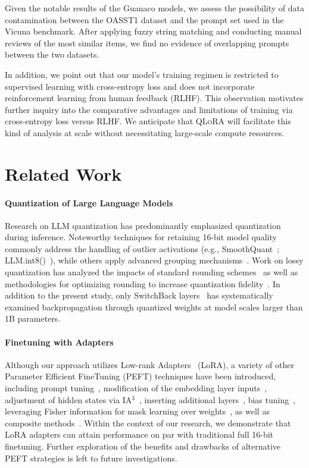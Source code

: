 Given the notable results of the {Guanaco} models, we assess the possibility of data contamination between the OASST1 dataset and the prompt set used in the Vicuna benchmark. After applying fuzzy string matching and conducting manual reviews of the most similar items, we find no evidence of overlapping prompts between the two datasets.

In addition, we point out that our model's training regimen is restricted to supervised learning with cross-entropy loss and does not incorporate reinforcement learning from human feedback (RLHF). This observation motivates further inquiry into the comparative advantages and limitations of training via cross-entropy loss versus RLHF. We anticipate that \textsc{QLoRA} will facilitate this kind of analysis at scale without necessitating large-scale compute resources.

\section{Related Work}

\paragraph{Quantization of Large Language Models} Research on LLM quantization has predominantly emphasized quantization during inference. Noteworthy techniques for retaining 16-bit model quality commonly address the handling of outlier activations (e.g., SmoothQuant~\citep{xiao2022smoothquant}; LLM.int8()~\citep{dettmers2022llm}), while others apply advanced grouping mechanisms~\citep{park2022nuqmm, yao2022zeroquant}. Work on lossy quantization has analyzed the impacts of standard rounding schemes~\citep{dettmers2022case,zeng2022glm,pope2022efficiently} as well as methodologies for optimizing rounding to increase quantization fidelity~\citep{frantar2022gptq}. In addition to the present study, only SwitchBack layers~\citep{wortsman2023stable} has systematically examined backpropagation through quantized weights at model scales larger than 1B parameters.

\paragraph{Finetuning with Adapters} Although our approach utilizes Low-rank Adapters~\citep{hu2021lora} (LoRA), a variety of other Parameter Efficient FineTuning (PEFT) techniques have been introduced, including prompt tuning~\citep{qin2021learning,lester2021power,li2021prefix}, modification of the embedding layer inputs~\citep{an2022input}, adjustment of hidden states via IA$^3$~\citep{liu2022few}, inserting additional layers~\citep{houlsby2019parameter}, bias tuning~\citep{zaken2021bitfit}, leveraging Fisher information for mask learning over weights~\citep{sung2021training}, as well as composite methods~\citep{henderson2021compacter}. Within the context of our research, we demonstrate that LoRA adapters can attain performance on par with traditional full 16-bit finetuning. Further exploration of the benefits and drawbacks of alternative PEFT strategies is left to future investigations.

